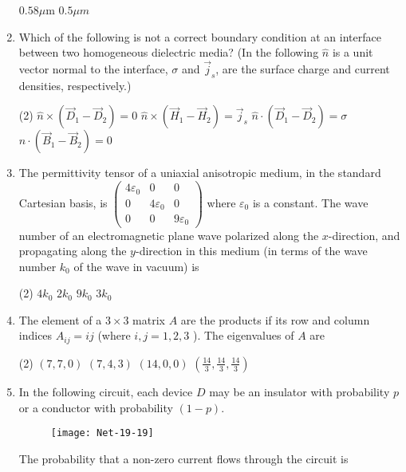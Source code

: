 \begin{enumerate}
\begin{tasks}
	\task[\textbf{c.}]$0.58 \mu \mathrm{m}$
	\task[\textbf{d.}]$0.5 \mu m$ 
\end{tasks}
\item  Which of the following is not a correct boundary condition at an interface between two homogeneous dielectric media? (In the following $\hat{n}$ is a unit vector normal to the interface, $\sigma$ and $\vec{j}_{s}$, are the surface charge and current densities, respectively.)
 \begin{tasks}(2)
	\task[\textbf{a.}]$\hat{n} \times\left(\vec{D}_{1}-\vec{D}_{2}\right)=0$
	\task[\textbf{b.}] $\hat{n} \times\left(\vec{H}_{1}-\vec{H}_{2}\right)=\vec{j}_{s}$
	\task[\textbf{c.}]$\hat{n} \cdot\left(\vec{D}_{1}-\vec{D}_{2}\right)=\sigma$
	\task[\textbf{d.}]  $\hat{n} \cdot\left(\vec{B}_{1}-\vec{B}_{2}\right)=0$
\end{tasks}
\item The permittivity tensor of a uniaxial anisotropic medium, in the standard Cartesian basis, is $\left(\begin{array}{ccc}4 \varepsilon_{0} & 0 & 0 \\ 0 & 4 \varepsilon_{0} & 0 \\ 0 & 0 & 9 \varepsilon_{0}\end{array}\right)$ where $\varepsilon_{0}$ is a constant. The wave number of an electromagnetic plane wave polarized along the $x$-direction, and propagating along the $y$-direction in this medium (in terms of the wave number $k_{0}$ of the wave in vacuum) is
 \begin{tasks}(2)
	\task[\textbf{a.}] $4 k_{0}$
	\task[\textbf{b.}]$2 k_{0}$
	\task[\textbf{c.}] $9 k_{0}$
	\task[\textbf{d.}] $3 k_{0}$
\end{tasks}
\item  The element of a $3 \times 3$ matrix $A$ are the products if its row and column indices $A_{i j}=i j$ (where $i, j=1,2,3$ ). The eigenvalues of $A$ are
 \begin{tasks}(2)
	\task[\textbf{a.}]$(7,7,0)$
	\task[\textbf{b.}]$(7,4,3)$
	\task[\textbf{c.}]$(14,0,0)$
	\task[\textbf{d.}] $\left(\frac{14}{3}, \frac{14}{3}, \frac{14}{3}\right)$
\end{tasks}
\item In the following circuit, each device $D$ may be an insulator with probability $p$ or a conductor with probability $(1-p)$.
\begin{figure}[H]
	\centering
	\texttt{[image: Net-19-19]}
\end{figure}
The probability that a non-zero current flows through the circuit is

\end{enumerate}
